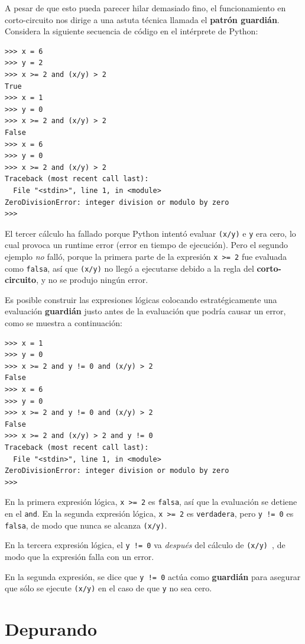 A pesar de que esto pueda parecer hilar demasiado fino, el funcionamiento
en corto-circuito nos dirige a una astuta técnica llamada el {\bf patrón guardián}.
Considera la siguiente secuencia de código en el intérprete de Python:

\beforeverb
\begin{verbatim}
>>> x = 6 
>>> y = 2
>>> x >= 2 and (x/y) > 2
True
>>> x = 1 
>>> y = 0
>>> x >= 2 and (x/y) > 2
False
>>> x = 6
>>> y = 0
>>> x >= 2 and (x/y) > 2
Traceback (most recent call last):
  File "<stdin>", line 1, in <module>
ZeroDivisionError: integer division or modulo by zero
>>> 
\end{verbatim}
\afterverb
%
El tercer cálculo ha fallado porque Python intentó evaluar {\tt (x/y)}
e {\tt y} era cero, lo cual provoca un runtime error (error en tiempo de ejecución). Pero el segundo
ejemplo \emph{no} falló, porque la primera parte de la expresión {\tt x >= 2}
fue evaluada como {\tt falsa}, así que {\tt (x/y)} no llegó a ejecutarse
debido a la regla del {\bf corto-circuito}, y no se produjo ningún error.

Es posible construir las expresiones lógicas colocando estratégicamente una
evaluación {\bf guardián} justo antes de la evaluación que podría causar un error,
como se muestra a continuación:

\beforeverb
\begin{verbatim}
>>> x = 1
>>> y = 0
>>> x >= 2 and y != 0 and (x/y) > 2
False
>>> x = 6 
>>> y = 0
>>> x >= 2 and y != 0 and (x/y) > 2
False
>>> x >= 2 and (x/y) > 2 and y != 0
Traceback (most recent call last):
  File "<stdin>", line 1, in <module>
ZeroDivisionError: integer division or modulo by zero
>>>
\end{verbatim}
\afterverb
%
En la primera expresión lógica, {\tt x >= 2} es {\tt falsa}, así que la evaluación
se detiene en el {\tt and}. En la segunda expresión lógica, {\tt x >= 2} es {\tt verdadera},
pero {\tt y != 0} es {\tt falsa}, de modo que nunca se alcanza {\tt (x/y)}.

En la tercera expresión lógica, el {\tt y != 0} va \emph{después} del
cálculo de {\tt (x/y) }, de modo que la expresión falla con un error.

En la segunda expresión, se dice que {\tt y != 0} actúa como {\bf guardián}
para asegurar que sólo se ejecute {\tt (x/y)} en el caso de que {\tt y} no sea cero.


\section{Depurando}
\label{whitespace}

